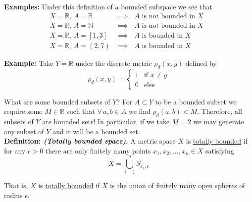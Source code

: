 \documentclass[12pt]{article}
\newlength\tindent
\renewcommand{\indent}{\hspace*{\tindent}}
\newcommand{\R}{\mathbb R}
\newcommand{\N}{\mathbb N}
\begin{document}
%
%
{\bf Examples:} Under this definition of a bounded subspace we see that 
\begin{align*}
	X = \R, ~ A = \R &\implies \text{ $A$ is not bounded in $X$ } \\
	X = \R, ~ A = \N &\implies \text{ $A$ is not bounded in $X$ } \\
	X = \R, ~ A = [1,3] &\implies \text{ $A$ is bounded in $X$ } \\
	X = \R, ~ A = (2,7) &\implies \text{ $A$ is bounded in $X$ }
\end{align*}

%
%
{\bf Example:} Take $Y = \R$ under the discrete metric $\rho_d(x, y)$ defined by
\begin{equation*}
	\rho_d(x,y) = 
	\begin{cases}
		1 & \text{if $x \neq y$} \\
		0 & \text{else}
	\end{cases}
\end{equation*}

\indent What are some bounded subsets of $Y$? For $A \subset Y$ to be a bounded subset we require some $M \in \R$ such that $\forall\,a,b\in A$ we find $\rho_d(a,b) < M$. Therefore, all subsets of $Y$ are bounded sets! In particular, if we take $M = 2$ we may generate any subset of $Y$ and it will be a bounded set. \\

%
%
{\bf Definition: {\em (Totally bounded space)}.} A metric space $X$ is \underline{totally bounded} if for any $\epsilon > 0$ there are only finitely many points $x_1, x_2, ..., x_n \in X$ satisfying
\begin{equation*}
	X = \bigcup^n_{i = 1} S_{x_i,\epsilon} 
\end{equation*}

That is, $X$ is \underline{totally bounded} if $X$ is the union of finitely many open spheres of radius $\epsilon$.
\end{document}
